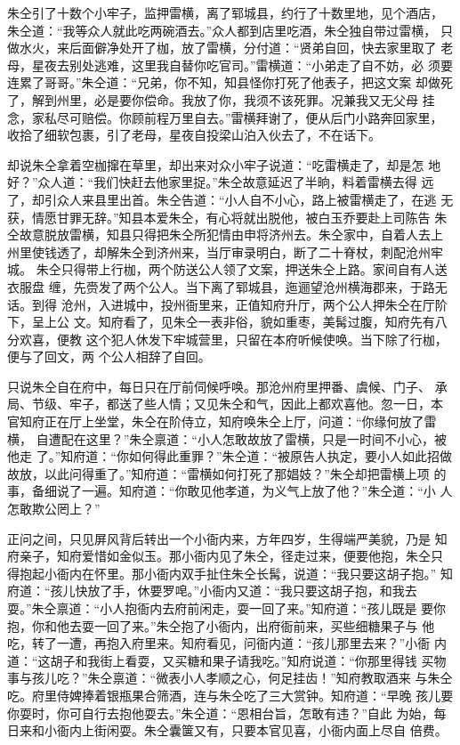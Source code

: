 朱仝引了十数个小牢子，监押雷横，离了郓城县，约行了十数里地，见个酒店，
朱仝道：“我等众人就此吃两碗酒去。”众人都到店里吃酒，朱仝独自带过雷横，
只做水火，来后面僻净处开了枷，放了雷横，分付道：“贤弟自回，快去家里取了
老母，星夜去别处逃难，这里我自替你吃官司。”雷横道：“小弟走了自不妨，必
须要连累了哥哥。”朱仝道：“兄弟，你不知，知县怪你打死了他表子，把这文案
却做死了，解到州里，必是要你偿命。我放了你，我须不该死罪。况兼我又无父母
挂念，家私尽可赔偿。你顾前程万里自去。”雷横拜谢了，便从后门小路奔回家里，
收拾了细软包裹，引了老母，星夜自投梁山泊入伙去了，不在话下。

却说朱仝拿着空枷撺在草里，却出来对众小牢子说道：“吃雷横走了，却是怎
地好？”众人道：“我们快赶去他家里捉。”朱仝故意延迟了半晌，料着雷横去得
远了，却引众人来县里出首。朱仝告道：“小人自不小心，路上被雷横走了，在逃
无获，情愿甘罪无辞。”知县本爱朱仝，有心将就出脱他，被白玉乔要赴上司陈告
朱仝故意脱放雷横，知县只得把朱仝所犯情由申将济州去。朱仝家中，自着人去上
州里使钱透了，却解朱仝到济州来，当厅审录明白，断了二十脊杖，刺配沧州牢城。
朱仝只得带上行枷，两个防送公人领了文案，押送朱仝上路。家间自有人送衣服盘
缠，先赍发了两个公人。当下离了郓城县，迤逦望沧州横海郡来，于路无话。到得
沧州，入进城中，投州衙里来，正值知府升厅，两个公人押朱仝在厅阶下，呈上公
文。知府看了，见朱仝一表非俗，貌如重枣，美髯过腹，知府先有八分欢喜，便教
这个犯人休发下牢城营里，只留在本府听候使唤。当下除了行枷，便与了回文，两
个公人相辞了自回。

只说朱仝自在府中，每日只在厅前伺候呼唤。那沧州府里押番、虞候、门子、
承局、节级、牢子，都送了些人情；又见朱仝和气，因此上都欢喜他。忽一日，本
官知府正在厅上坐堂，朱仝在阶侍立，知府唤朱仝上厅，问道：“你缘何放了雷横，
自遭配在这里？”朱仝禀道：“小人怎敢故放了雷横，只是一时间不小心，被他走
了。”知府道：“你如何得此重罪？”朱仝道：“被原告人执定，要小人如此招做
故放，以此问得重了。”知府道：“雷横如何打死了那娼妓？”朱仝却把雷横上项
的事，备细说了一遍。知府道：“你敢见他孝道，为义气上放了他？”朱仝道：“小
人怎敢欺公罔上？”

正问之间，只见屏风背后转出一个小衙内来，方年四岁，生得端严美貌，乃是
知府亲子，知府爱惜如金似玉。那小衙内见了朱仝，径走过来，便要他抱，朱仝只
得抱起小衙内在怀里。那小衙内双手扯住朱仝长髯，说道：“我只要这胡子抱。”
知府道：“孩儿快放了手，休要罗唣。”小衙内又道：“我只要这胡子抱，和我去
耍。”朱仝禀道：“小人抱衙内去府前闲走，耍一回了来。”知府道：“孩儿既是
要你抱，你和他去耍一回了来。”朱仝抱了小衙内，出府衙前来，买些细糖果子与
他吃，转了一遭，再抱入府里来。知府看见，问衙内道：“孩儿那里去来？”小衙
内道：“这胡子和我街上看耍，又买糖和果子请我吃。”知府说道：“你那里得钱
买物事与孩儿吃？”朱仝禀道：“微表小人孝顺之心，何足挂齿！”知府教取酒来
与朱仝吃。府里侍婢捧着银瓶果合筛酒，连与朱仝吃了三大赏钟。知府道：“早晚
孩儿要你耍时，你可自行去抱他耍去。”朱仝道：“恩相台旨，怎敢有违？”自此
为始，每日来和小衙内上街闲耍。朱仝囊箧又有，只要本官见喜，小衙内面上尽自
倍费。


